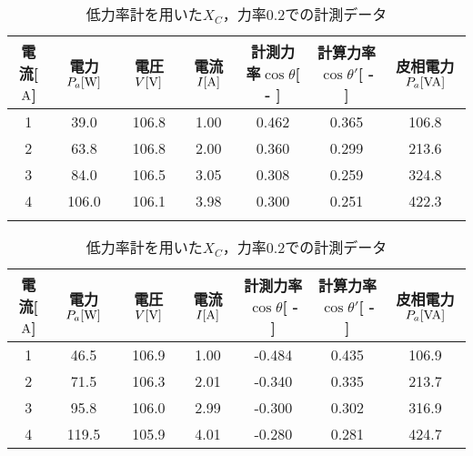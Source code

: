 \begin{table}[h]
\centering
\caption{低力率計を用いた$X_{L}$，力率$0.2$での計測データ}
\label{tab:low0.2XL}
\begin{tabular}{ccccccc}
	\hline
	電流[$\rm{A}$] & 電力$P_a[\rm{W}]$ & 電圧$V[\rm{V}]$ & 電流$I[\rm{A}]$ & 計測力率$\cos \theta$[ - ] & 計算力率$\cos \theta '$[ - ] & 皮相電力$P_a[\rm{VA}]$ \\ \hline
	1 & 39.0  & 106.8 & 1.00 & 0.462 & 0.365 & 106.8 \\
	2 & 63.8  & 106.8 & 2.00 & 0.360 & 0.299 & 213.6 \\
	3 & 84.0  & 106.5 & 3.05 & 0.308 & 0.259 & 324.8 \\
	4 & 106.0 & 106.1 & 3.98 & 0.300 & 0.251 & 422.3 \\ \hline\\
\end{tabular}
\caption{低力率計を用いた$X_{C}$，力率$0.2$での計測データ}
\label{tab:low0.2XC}
\begin{tabular}{ccccccc}
\hline
電流[$\rm{A}$] & 電力$P_a[\rm{W}]$ & 電圧$V[\rm{V}]$ & 電流$I[\rm{A}]$ & 計測力率$\cos \theta$[ - ] & 計算力率$\cos \theta '$[ - ] & 皮相電力$P_a[\rm{VA}]$ \\ \hline
1 & 46.5  & 106.9 & 1.00 & -0.484 & 0.435 & 106.9 \\
2 & 71.5  & 106.3 & 2.01 & -0.340 & 0.335 & 213.7 \\
3 & 95.8  & 106.0 & 2.99 & -0.300 & 0.302 & 316.9 \\
4 & 119.5 & 105.9 & 4.01 & -0.280 & 0.281 & 424.7 \\ \hline
\end{tabular}
\end{table}
